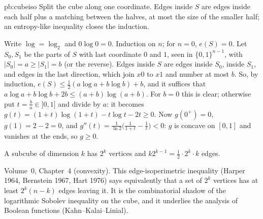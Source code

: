 \begin{solution}{pb:cubeiso}
\idea Split the cube along one coordinate. Edges inside $S$ are edges inside each half plus a matching between the halves, at most
the size of the smaller half; an entropy-like inequality closes the induction.

\writeup Write $\log=\log_2$ and $0\log0=0$. Induction on $n$; for $n=0$, $e(S)=0$. Let $S_0,S_1$ be the parts of $S$ with last coordinate $0$
and $1$, seen in $\{0,1\}^{n-1}$, with $|S_0|=a\ge|S_1|=b$ (or the reverse). Edges inside $S$ are edges inside $S_0$, inside $S_1$, and edges in
the last direction, which join $x0$ to $x1$ and number at most $b$. So, by induction, $e(S)\le\frac12(a\log a+b\log b)+b$, and it suffices
that $a\log a+b\log b+2b\le(a+b)\log(a+b)$. For $b=0$ this is clear; otherwise put $t=\frac ba\in]0,1]$ and divide by $a$: it becomes
$g(t)=(1+t)\log(1+t)-t\log t-2t\ge0$. Now $g(0^+)=0$, $g(1)=2-2=0$, and $g''(t)=\frac1{\ln2}\bigl(\frac1{1+t}-\frac1t\bigr)<0$: $g$ is concave on $[0,1]$
and vanishes at the ends, so $g\ge0$.

A subcube of dimension $k$ has $2^k$ vertices and $k2^{k-1}=\frac12\cdot2^k\cdot k$ edges.

\tools Volume~0, Chapter~4 (convexity).
\leads This edge-isoperimetric inequality (Harper 1964, Bernstein 1967, Hart 1976) says equivalently that a set of $2^k$ vertices has at least
$2^k(n-k)$ edges leaving it. It is the combinatorial shadow of the logarithmic Sobolev inequality on the cube, and it underlies
the analysis of Boolean functions (Kahn--Kalai--Linial).
\end{solution}


